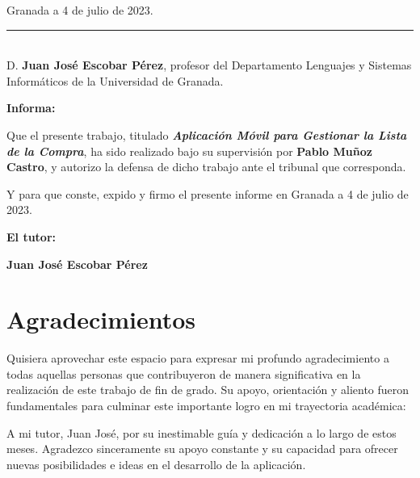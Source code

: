 \begin{flushright}
Granada a 4 de julio de 2023.
\end{flushright}

\newpage

\noindent\rule[-1ex]{\textwidth}{2pt}\\[4.5ex]

D. \textbf{Juan José Escobar Pérez}, profesor del Departamento Lenguajes y Sistemas Informáticos de la Universidad de Granada.


\vspace{0.5cm}

\textbf{Informa:}

\vspace{0.5cm}

Que el presente trabajo, titulado \textit{\textbf{Aplicación Móvil para Gestionar la Lista de la Compra}}, ha sido realizado bajo su supervisión por \textbf{Pablo Muñoz Castro}, y autorizo la defensa de dicho trabajo ante el tribunal que corresponda.

\vspace{0.5cm}

Y para que conste, expido y firmo el presente informe en Granada a 4 de julio de 2023.

\vspace{2cm}

\textbf{El tutor:}

\vspace{1cm}

\noindent \textbf{Juan José Escobar Pérez}

\newpage

\section*{Agradecimientos}
\thispagestyle{empty}

       \vspace{1cm}

Quisiera aprovechar este espacio para expresar mi profundo agradecimiento a todas aquellas personas que contribuyeron de manera significativa en la realización de este trabajo de fin de grado. Su apoyo, orientación y aliento fueron fundamentales para culminar este importante logro en mi trayectoria académica:

A mi tutor, Juan José, por su inestimable guía y dedicación a lo largo de estos meses. Agradezco sinceramente su apoyo constante y su capacidad para ofrecer nuevas posibilidades e ideas en el desarrollo de la aplicación.

